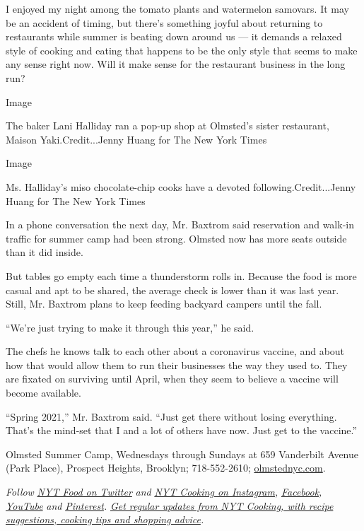 I enjoyed my night among the tomato plants and watermelon samovars. It
may be an accident of timing, but there's something joyful about
returning to restaurants while summer is beating down around us --- it
demands a relaxed style of cooking and eating that happens to be the
only style that seems to make any sense right now. Will it make sense
for the restaurant business in the long run?

Image

The baker Lani Halliday ran a pop-up shop at Olmsted's sister
restaurant, Maison Yaki.Credit...Jenny Huang for The New York Times

Image

Ms. Halliday's miso chocolate-chip cooks have a devoted
following.Credit...Jenny Huang for The New York Times

In a phone conversation the next day, Mr. Baxtrom said reservation and
walk-in traffic for summer camp had been strong. Olmsted now has more
seats outside than it did inside.

But tables go empty each time a thunderstorm rolls in. Because the food
is more casual and apt to be shared, the average check is lower than it
was last year. Still, Mr. Baxtrom plans to keep feeding backyard campers
until the fall.

``We're just trying to make it through this year,'' he said.

The chefs he knows talk to each other about a coronavirus vaccine, and
about how that would allow them to run their businesses the way they
used to. They are fixated on surviving until April, when they seem to
believe a vaccine will become available.

``Spring 2021,'' Mr. Baxtrom said. ``Just get there without losing
everything. That's the mind-set that I and a lot of others have now.
Just get to the vaccine.''

Olmsted Summer Camp, Wednesdays through Sundays at 659 Vanderbilt Avenue
(Park Place), Prospect Heights, Brooklyn; 718-552-2610;
\href{http://olmstednyc.com/}{olmstednyc.com}.

\emph{Follow} \href{https://twitter.com/nytfood}{\emph{NYT Food on
Twitter}} \emph{and}
\href{https://www.instagram.com/nytcooking/}{\emph{NYT Cooking on
Instagram}}\emph{,}
\href{https://www.facebookcorewwwi.onion/nytcooking/}{\emph{Facebook}}\emph{,}
\href{https://www.youtube.com/nytcooking}{\emph{YouTube}} \emph{and}
\href{https://www.pinterest.com/nytcooking/}{\emph{Pinterest}}\emph{.}
\href{https://www.nytimes3xbfgragh.onion/newsletters/cooking}{\emph{Get
regular updates from NYT Cooking, with recipe suggestions, cooking tips
and shopping advice}}\emph{.}

